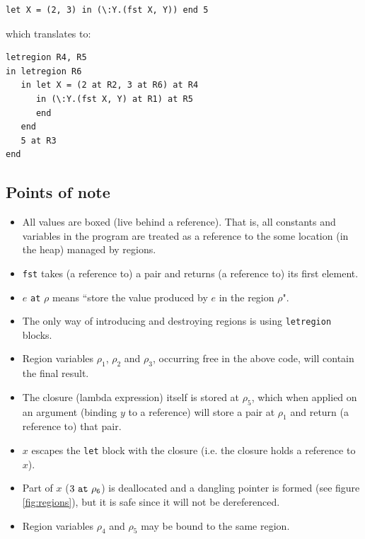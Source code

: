 \documentclass[11pt]{report}
\begin{document}
\begin{lstlisting}
let X = (2, 3) in (\:Y.(fst X, Y)) end 5
\end{lstlisting}

\noindent which translates to:

\begin{lstlisting}
letregion R4, R5
in letregion R6
   in let X = (2 at R2, 3 at R6) at R4
      in (\:Y.(fst X, Y) at R1) at R5
      end
   end
   5 at R3
end
\end{lstlisting}

\subsection*{Points of note}

\begin{itemize}
\item All values are boxed (live behind a reference). That is, all constants and variables in the program are treated as a reference to the some location (in the heap) managed by regions.
\item \texttt{fst} takes (a reference to) a pair and returns (a reference to) its first element.
\item $e$ \texttt{at} $\rho$ means ``store the value produced by $e$ in the region $\rho$".
\item The only way of introducing and destroying regions is using \texttt{letregion} blocks.
\item Region variables $\rho_1$, $\rho_2$ and $\rho_3$, occurring free in the above code, will contain the final result.
\item The closure (lambda expression) itself is stored at $\rho_5$, which when applied on an argument (binding $y$ to a reference) will store a pair at $\rho_1$ and return (a reference to) that pair.
\item $x$ escapes the \texttt{let} block with the closure (i.e. the closure holds a reference to $x$).
\item Part of $x$ ($3\tt~at~\rho_6$) is deallocated and a dangling pointer is formed (see figure \ref{fig:regions}), but it is safe since it will not be dereferenced.
\item Region variables $\rho_4$ and $\rho_5$ may be bound to the same region.
\end{itemize}
\end{document}
